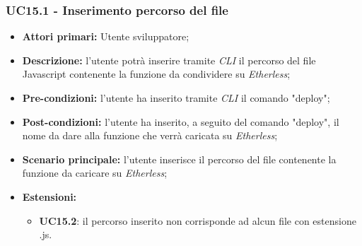 \subsubsection{UC15.1 - Inserimento percorso del file}
\begin{itemize}
	\item \textbf{Attori primari:} Utente sviluppatore;
	\item \textbf{Descrizione:} l'utente potrà inserire tramite \textit{CLI\glo} il percorso del file Javascript contenente la funzione da condividere su \textit{Etherless}; 
	\item \textbf{Pre-condizioni:} l'utente ha inserito tramite \textit{CLI\glo} il comando "deploy";
	\item \textbf{Post-condizioni:} l'utente ha inserito, a seguito del comando "deploy", il nome da dare alla funzione che verrà caricata su \textit{Etherless};
	\item \textbf{Scenario principale:} l'utente inserisce il percorso del file contenente la funzione da caricare su \textit{Etherless};
	\item \textbf{Estensioni:} 
	\begin{itemize}
		\item \textbf{UC15.2}: il percorso inserito non corrisponde ad alcun file con estensione .js.
	\end{itemize}
\end{itemize}